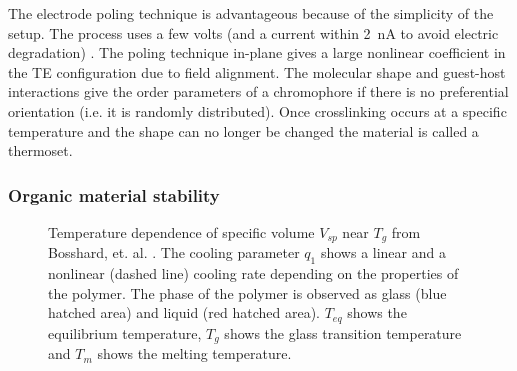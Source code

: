 The electrode poling technique is advantageous because of the simplicity of the setup. The process uses a few volts (and a current within \SI{2}{\nano\ampere} to avoid electric degradation) \cite{BlumPoling98}. The poling technique in-plane gives a large nonlinear coefficient in the TE configuration due to field alignment. The molecular shape and guest-host interactions give the order parameters of a chromophore if there is no preferential orientation (i.e. it is randomly distributed).  Once crosslinking occurs at a specific temperature and the shape can no longer be changed the material is called a thermoset.  %



\subsubsection{Organic material stability}

\begin{figure}[!ht]
\centering

\caption{Temperature dependence of specific volume $V_{sp}$ near $T_g$ from Bosshard, et. al. \cite{BosshardOrgaNLO95}. The cooling parameter $q_1$ shows a linear and a nonlinear (dashed line) cooling rate depending on the properties of the polymer. The phase of the polymer is observed as glass (blue hatched area) and liquid (red hatched area). $T_{eq}$ shows the equilibrium temperature, $T_g$ shows the glass transition temperature and $T_m$ shows the melting temperature.}
\label{fig:Bosshard_temp}
\end{figure}



